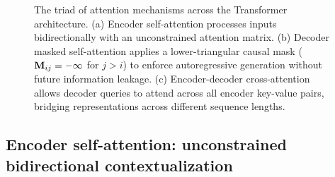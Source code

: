 \documentclass[../../main.tex]{subfiles}
\begin{document}
\begin{figure}[htbp]
{\begin{tikzpicture}
\end{tikzpicture}%
}
\caption{The triad of attention mechanisms across the Transformer architecture. (a) Encoder self-attention processes inputs bidirectionally with an unconstrained attention matrix. (b) Decoder masked self-attention applies a lower-triangular causal mask ($\mathbf{M}_{ij} = -\infty$ for $j > i$) to enforce autoregressive generation without future information leakage. (c) Encoder-decoder cross-attention allows decoder queries to attend across all encoder key-value pairs, bridging representations across different sequence lengths.}
\label{fig:attention_triad_types}
\end{figure}

\subsection{Encoder self-attention: unconstrained bidirectional contextualization}
\label{subsec:encoder_self_attention}
\end{document}
